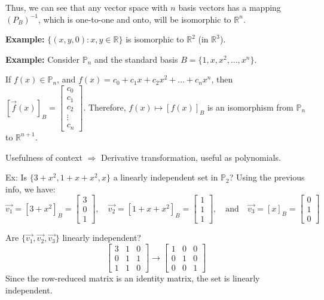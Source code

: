 \documentclass{article}
\begin{document}
Thus, we can see that any vector space with \(n\) basis vectors has a mapping \((P_B)^{-1}\), which is one-to-one and onto, will be isomorphic to \(\mathbb{R}^n\).

\textbf{Example:} \(\{(x,y,0) : x,y \in \mathbb{R}\}\) is isomorphic to \(\mathbb{R}^2\) (in \(\mathbb{R}^3\)).

\textbf{Example:} Consider \(\mathbb{P}_n\) and the standard basis \(B = \{1,x,x^2,\ldots,x^n\}\).

If \(f(x) \in \mathbb{P}_n\), and \(f(x) = c_0 + c_1x + c_2x^2 + \ldots + c_nx^n\), then \([\vec{f}(x)]_B = \begin{bmatrix} c_0 \\ c_1 \\ c_2 \\ \vdots \\ c_n \end{bmatrix}\). Therefore, \(f(x) \mapsto [f(x)]_B\) is an isomorphism from \(\mathbb{P}_n\) to \(\mathbb{R}^{n+1}\).


Usefulness of context $\Rightarrow$ Derivative transformation, useful as polynomials.

Ex: Is $\{3+x^2, 1+x+x^2, x\}$ a linearly independent set in \(\mathbb{P}_2\)? Using the previous info, we have:
\[\vec{v_1} = [3+x^2]_B = \begin{bmatrix} 3 \\ 0 \\ 1 \end{bmatrix}, \quad \vec{v_2} = [1+x+x^2]_B = \begin{bmatrix} 1 \\ 1 \\ 1 \end{bmatrix}, \quad \text{and} \quad \vec{v_3}=[x]_B = \begin{bmatrix} 0 \\ 1 \\ 0 \end{bmatrix}\]

Are \(\{\vec{v_1}, \vec{v_2}, \vec{v_3}\}\) linearly independent? 
\[\begin{bmatrix} 3 & 1 & 0 \\ 0 & 1 & 1 \\ 1 & 1 & 0 \end{bmatrix} \rightarrow \begin{bmatrix} 1 & 0 & 0 \\ 0 & 1 & 0 \\ 0 & 0 & 1 \end{bmatrix}\]
Since the row-reduced matrix is an identity matrix, the set is linearly independent.
\end{document}
